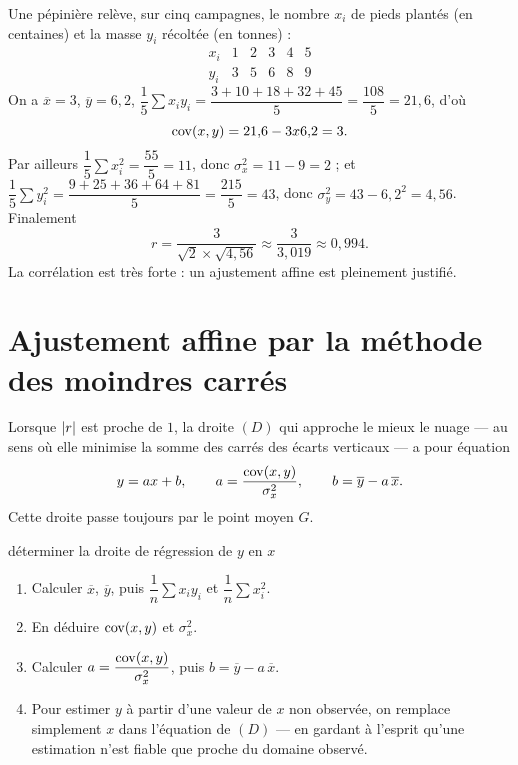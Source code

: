 \begin{exemple}
Une pépinière relève, sur cinq campagnes, le nombre $x_{i}$ de pieds
plantés (en centaines) et la masse $y_{i}$ récoltée (en tonnes) :
\[
  \begin{array}{c|ccccc}
    x_{i} & 1 & 2 & 3 & 4 & 5 \\
    \hline
    y_{i} & 3 & 5 & 6 & 8 & 9
  \end{array}
\]
On a $\overline{x} = 3$, $\overline{y} = 6{,}2$,
$\dfrac{1}{5}\sum x_{i}y_{i}
= \dfrac{3+10+18+32+45}{5} = \dfrac{108}{5} = 21{,}6$, d'où
\[
  \operatorname{cov}(x,y) = 21{,}6-3 x 6{,}2 = 3.
\]
Par ailleurs $\dfrac{1}{5}\sum x_{i}^{2} = \dfrac{55}{5} = 11$, donc
$\sigma_{x}^{2} = 11-9 = 2$ ; et $\dfrac{1}{5}\sum y_{i}^{2}
= \dfrac{9+25+36+64+81}{5} = \dfrac{215}{5} = 43$, donc
$\sigma_{y}^{2} = 43-6{,}2^{2} = 4{,}56$. Finalement
\[
  r = \frac{3}{\sqrt2 \times \sqrt{4{,}56}} \approx \frac{3}{3{,}019}
  \approx 0{,}994 .
\]
La corrélation est très forte : un ajustement affine est pleinement
justifié.
\end{exemple}

\section{Ajustement affine par la méthode des moindres carrés}

\begin{theoreme}
Lorsque $\left|r\right|$ est proche de $1$, la droite $(D)$ qui approche le mieux le
nuage — au sens où elle minimise la somme des carrés des écarts verticaux —
a pour équation
\[
  y = ax+b, \qquad
  a = \frac{\operatorname{cov}(x,y)}{\sigma_{x}^{2}}, \qquad
  b = \overline{y}-a\,\overline{x} .
\]
Cette droite passe toujours par le point moyen $G$.
\end{theoreme}

\begin{methode}{déterminer la droite de régression de $y$ en $x$}
\begin{enumerate}[label=\textbf{\arabic*.}, leftmargin=*, itemsep=0.15em]
  \item Calculer $\overline{x}$, $\overline{y}$, puis
        $\dfrac{1}{n}\sum x_{i}y_{i}$ et $\dfrac{1}{n}\sum x_{i}^{2}$.
  \item En déduire $\operatorname{cov}(x,y)$ et $\sigma_{x}^{2}$.
  \item Calculer $a = \dfrac{\operatorname{cov}(x,y)}{\sigma_{x}^{2}}$, puis
        $b = \overline{y}-a\,\overline{x}$.
  \item Pour estimer $y$ à partir d'une valeur de $x$ non observée, on
        remplace simplement $x$ dans l'équation de $(D)$ — en gardant à
        l'esprit qu'une estimation n'est fiable que proche du domaine
        observé.
\end{enumerate}
\end{methode}

